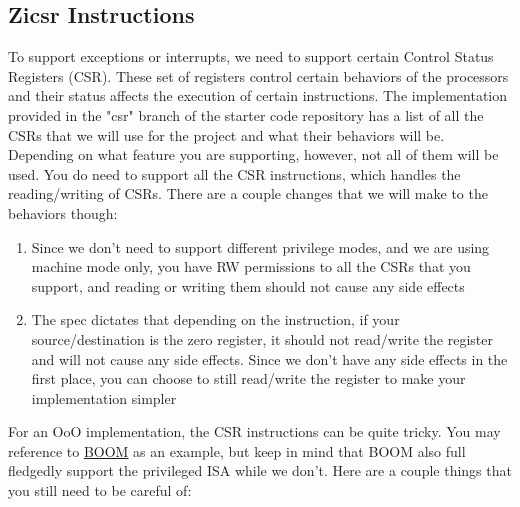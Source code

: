 \documentclass{article}
\begin{document}
\subsection{Zicsr Instructions}
To support exceptions or interrupts, we need to support certain Control Status Registers (CSR). These set of registers control certain behaviors of the processors and their status affects the execution of certain instructions. The implementation provided in the "csr" branch of the starter code repository has a list of all the CSRs that we will use for the project and what their behaviors will be. Depending on what feature you are supporting, however, not all of them will be used. You do need to support all the CSR instructions, which handles the reading/writing of CSRs. There are a couple changes that we will make to the behaviors though:
\begin{enumerate}
    \item Since we don't need to support different privilege modes, and we are using machine mode only, you have RW permissions to all the CSRs that you support, and reading or writing them should not cause any side effects
    \item The spec dictates that depending on the instruction, if your source/destination is the zero register, it should not read/write the register and will not cause any side effects. Since we don't have any side effects in the first place, you can choose to still read/write the register to make your implementation simpler
\end{enumerate}
For an OoO implementation, the CSR instructions can be quite tricky. You may reference to \hyperlink{https://docs.boom-core.org/en/latest/sections/execution-stages.html\#control-status-register-instructions}{BOOM} as an example, but keep in mind that BOOM also full fledgedly support the privileged ISA while we don't. Here are a couple things that you still need to be careful of:
\end{document}

